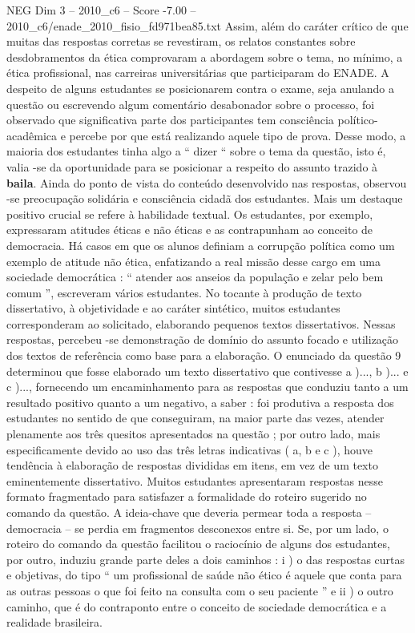 \begin{textsample}{NEG Dim 3 – 2010\_c6 – Score -7.00 – 2010\_c6/enade\_2010\_fisio\_fd971bea85.txt}
Assim, além do caráter crítico de que muitas das respostas corretas se revestiram, os relatos constantes sobre desdobramentos da ética comprovaram a abordagem sobre o tema, no mínimo, a ética profissional, nas carreiras universitárias que participaram do ENADE.
A despeito de alguns estudantes se posicionarem contra o exame, seja anulando a questão ou escrevendo algum comentário desabonador sobre o processo, foi observado que significativa parte dos participantes tem consciência político-acadêmica e percebe por que está realizando aquele tipo de prova.
Desse modo, a maioria dos estudantes tinha algo a “ dizer “ sobre o tema da questão, isto é, valia -se da oportunidade para se posicionar a respeito do assunto trazido à \textbf{baila}.
Ainda do ponto de vista do conteúdo desenvolvido nas respostas, observou -se preocupação solidária e consciência cidadã dos estudantes.
Mais um destaque positivo crucial se refere à habilidade textual.
Os estudantes, por exemplo, expressaram atitudes éticas e não éticas e as contrapunham ao conceito de democracia.
Há casos em que os alunos definiam a corrupção política como um exemplo de atitude não ética, enfatizando a real missão desse cargo em uma sociedade democrática : “ atender aos anseios da população e zelar pelo bem comum ”, escreveram vários estudantes.
No tocante à produção de texto dissertativo, à objetividade e ao caráter sintético, muitos estudantes corresponderam ao solicitado, elaborando pequenos textos dissertativos.
Nessas respostas, percebeu -se demonstração de domínio do assunto focado e utilização dos textos de referência como base para a elaboração.
O enunciado da questão 9 determinou que fosse elaborado um texto dissertativo que contivesse a )..., b )... e c )..., fornecendo um encaminhamento para as respostas que conduziu tanto a um resultado positivo quanto a um negativo, a saber : foi produtiva a resposta dos estudantes no sentido de que conseguiram, na maior parte das vezes, atender plenamente aos três quesitos apresentados na questão ; por outro lado, mais especificamente devido ao uso das três letras indicativas ( a, b e c ), houve tendência à elaboração de respostas divididas em itens, em vez de um texto eminentemente dissertativo.
Muitos estudantes apresentaram respostas nesse formato fragmentado para satisfazer a formalidade do roteiro sugerido no comando da questão.
A ideia-chave que deveria permear toda a resposta – democracia – se perdia em fragmentos desconexos entre si.
Se, por um lado, o roteiro do comando da questão facilitou o raciocínio de alguns dos estudantes, por outro, induziu grande parte deles a dois caminhos : i ) o das respostas curtas e objetivas, do tipo “ um profissional de saúde não ético é aquele que conta para as outras pessoas o que foi feito na consulta com o seu paciente ” e ii ) o outro caminho, que é do contraponto entre o conceito de sociedade democrática e a realidade brasileira.

\end{textsample}
